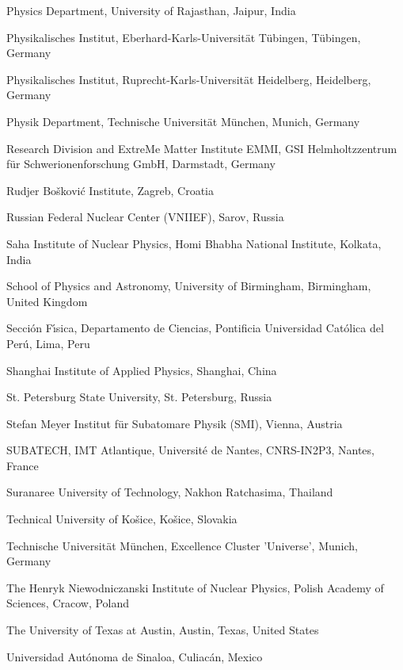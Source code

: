 \begin{flushleft}
\begin{Authlist}
\item {}Physics Department, University of Rajasthan, Jaipur, India
\item {}Physikalisches Institut, Eberhard-Karls-Universit\"{a}t T\"{u}bingen, T\"{u}bingen, Germany
\item {}Physikalisches Institut, Ruprecht-Karls-Universit\"{a}t Heidelberg, Heidelberg, Germany
\item {}Physik Department, Technische Universit\"{a}t M\"{u}nchen, Munich, Germany
\item {}Research Division and ExtreMe Matter Institute EMMI, GSI Helmholtzzentrum f\"ur Schwerionenforschung GmbH, Darmstadt, Germany
\item {}Rudjer Bo\v{s}kovi\'{c} Institute, Zagreb, Croatia
\item {}Russian Federal Nuclear Center (VNIIEF), Sarov, Russia
\item {}Saha Institute of Nuclear Physics, Homi Bhabha National Institute, Kolkata, India
\item {}School of Physics and Astronomy, University of Birmingham, Birmingham, United Kingdom
\item {}Secci\'{o}n F\'{\i}sica, Departamento de Ciencias, Pontificia Universidad Cat\'{o}lica del Per\'{u}, Lima, Peru
\item {}Shanghai Institute of Applied Physics, Shanghai, China
\item {}St. Petersburg State University, St. Petersburg, Russia
\item {}Stefan Meyer Institut f\"{u}r Subatomare Physik (SMI), Vienna, Austria
\item {}SUBATECH, IMT Atlantique, Universit\'{e} de Nantes, CNRS-IN2P3, Nantes, France
\item {}Suranaree University of Technology, Nakhon Ratchasima, Thailand
\item {}Technical University of Ko\v{s}ice, Ko\v{s}ice, Slovakia
\item {}Technische Universit\"{a}t M\"{u}nchen, Excellence Cluster 'Universe', Munich, Germany
\item {}The Henryk Niewodniczanski Institute of Nuclear Physics, Polish Academy of Sciences, Cracow, Poland
\item {}The University of Texas at Austin, Austin, Texas, United States
\item {}Universidad Aut\'{o}noma de Sinaloa, Culiac\'{a}n, Mexico

\end{Authlist}
\end{flushleft}
